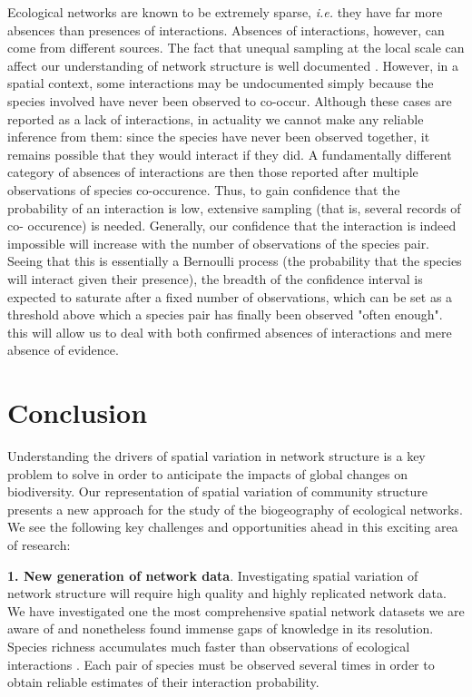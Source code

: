 \documentclass[12pt]{article}
\begin{document}
Ecological networks are known to be extremely sparse, \emph{i.e.} they have
far more absences than presences of interactions. Absences of interactions,
however, can come from different sources. The fact that unequal sampling at
the local scale can affect our understanding of network structure is well
documented \citep{Martinez1999}. However, in a spatial context, some
interactions may be undocumented simply because the species involved have
never been observed to co-occur. Although these cases are reported as a lack
of interactions, in actuality we cannot make any reliable inference from them:
since the species have never been observed together, it remains possible that
they would interact if they did. A fundamentally different category of
absences of interactions are then those reported after multiple observations
of species co-occurence. Thus, to gain confidence that the probability of an
interaction is low, extensive sampling (that is, several records of co-
occurence) is needed. Generally, our confidence that the interaction is indeed
impossible will increase with the number of observations of the species pair.
Seeing that this is essentially a Bernoulli process (the probability that the
species will interact given their presence), the breadth of the confidence
interval is expected to saturate after a fixed number of observations, which
can be set as a threshold above which a species pair has finally been observed
"often enough". this will allow us to deal with both confirmed absences of
interactions and mere absence of evidence.

\section*{Conclusion}

Understanding the drivers of spatial variation in network structure is a
key problem to solve in order to anticipate the impacts of global changes on
biodiversity. Our representation of spatial variation of community
structure presents a new approach for the study of the biogeography of ecological
networks. We see the following key challenges and opportunities ahead in this
exciting area of research:

\textbf{1. New generation of network data}. Investigating spatial
variation of network structure will require high quality and highly replicated
network data. We have investigated one the most comprehensive spatial network
datasets we are aware of and nonetheless found immense gaps of knowledge in its
resolution. Species richness accumulates much faster than observations of
ecological interactions \citep{Poisot2012}. Each pair of species must be
observed several times in order to obtain reliable estimates of their interaction
probability.
\end{document}

